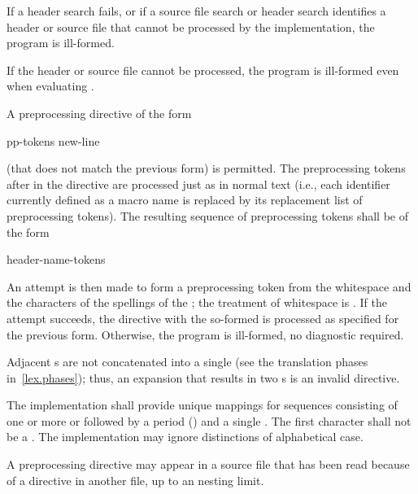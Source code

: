 \pnum
If a header search fails, or if a source file search or header search
identifies a header or source file that cannot be processed by the implementation,
the program is ill-formed.
\begin{note}
If the header or source file cannot be processed,
the program is ill-formed even when evaluating .
\end{note}

\pnum
A preprocessing directive of the form
\begin{ncsimplebnf}
 pp-tokens new-line
\end{ncsimplebnf}
(that does not match the previous form) is permitted.
The preprocessing tokens after
in the directive are processed just as in normal text
(i.e., each identifier currently defined as a macro name is replaced by its
replacement list of preprocessing tokens).
The resulting sequence of preprocessing tokens shall be of the form
\begin{ncsimplebnf}
header-name-tokens
\end{ncsimplebnf}
An attempt is then made to form a 
preprocessing token from the whitespace and the characters
of the spellings of the ;
the treatment of whitespace
is .
If the attempt succeeds, the directive with the so-formed 
is processed as specified for the previous form.
Otherwise, the program is ill-formed, no diagnostic required.
\begin{note}
Adjacent s are not concatenated into
a single 
(see the translation phases in~\ref{lex.phases});
thus, an expansion that results in two s is an
invalid directive.
\end{note}

\pnum
The implementation shall provide unique mappings for
sequences consisting of one or more
 or 
followed by a period
()
and a single
.
The first character shall not be a .
The implementation may ignore distinctions of alphabetical case.

\pnum
A
preprocessing directive may appear
in a source file that has been read because of a
directive in another file,
up to an  nesting limit.

